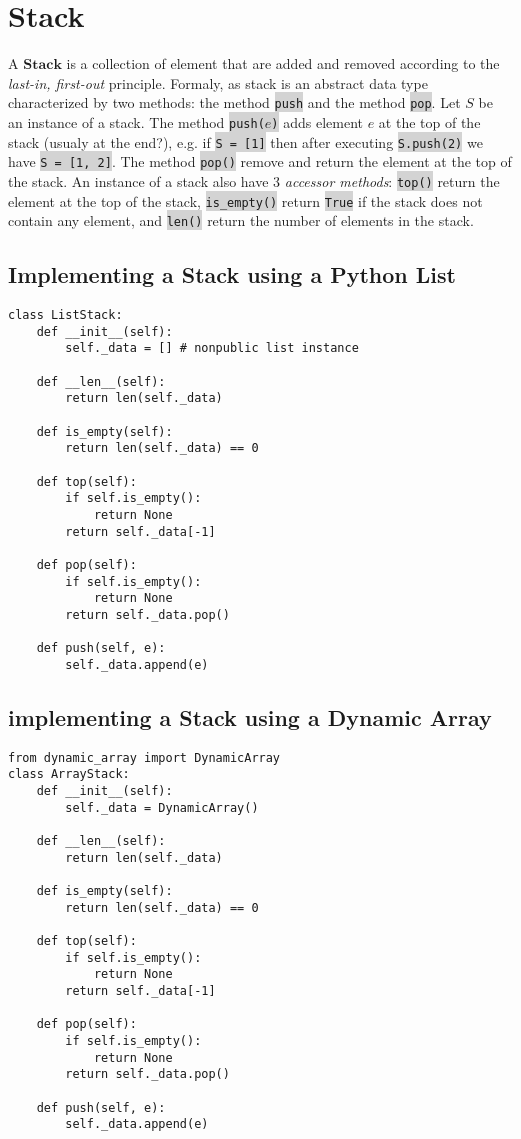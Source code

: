\documentclass[10pt]{article}
\newcommand{\code}[1]{{\small\colorbox{LightGray}{\texttt{#1}}}}
\begin{document}
\section{Stack}
A $\bm{Stack}$ is a collection of element that are added and removed according to the \textit{last-in, first-out} principle. Formaly, as stack is an abstract data type characterized by two methods: the method \code{push} and the method \code{pop}. Let $S$ be an instance of a stack. The method \code{push($e$)} adds element $e$ at the top of the stack (usualy at the end?), e.g. if \code{S = [1]} then after executing \code{S.push(2)} we have \code{S = [1, 2]}. The method \code{pop()} remove and return the element at the top of the stack. An instance of a stack also have 3 \textit{accessor methods}: \code{top()} return the element at the top of the stack, \code{is\_empty()} return \code{True} if the stack does not contain any element, and \code{len()} return the number of elements in the stack.

\subsection{Implementing a Stack using a Python List}
\begin{verbatim}
class ListStack:
    def __init__(self):
        self._data = [] # nonpublic list instance
    
    def __len__(self):
        return len(self._data)
    
    def is_empty(self):
        return len(self._data) == 0
    
    def top(self):
        if self.is_empty():
            return None
        return self._data[-1]
             
    def pop(self):
        if self.is_empty():
            return None 
        return self._data.pop()
            
    def push(self, e):
        self._data.append(e)
\end{verbatim}

\subsection{implementing a Stack using a Dynamic Array}

\begin{verbatim}
from dynamic_array import DynamicArray
class ArrayStack:
    def __init__(self):
        self._data = DynamicArray()

    def __len__(self):
        return len(self._data)

    def is_empty(self):
        return len(self._data) == 0
    
    def top(self):
        if self.is_empty():
            return None
        return self._data[-1]

    def pop(self):
        if self.is_empty():
            return None 
        return self._data.pop()

    def push(self, e):
        self._data.append(e)
\end{verbatim}
\end{document}
